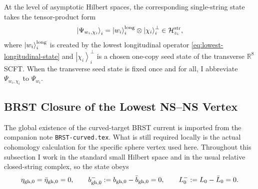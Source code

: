 \documentclass[11pt]{article}
\newcommand{\mc}[1]{\mathcal{#1}}
\newcommand{\bR}{\mathbb{R}}
\newcommand{\gh}{\mathrm{gh}}
\begin{document}
At the level of asymptotic Hilbert spaces, the corresponding single-string state takes the tensor-product form
\begin{equation}\label{eq:single-string-state-factorization}
\left|\Psi_{w_i,\chi_i}\right\rangle_i
=
\left|w_i\right\rangle_i^{\rm long}\otimes \left|\chi_i\right\rangle_i^\perp
\in
\mc H^{\rm str}_{z_i},
\end{equation}
where $\left|w_i\right\rangle_i^{\rm long}$ is created by the lowest longitudinal operator \eqref{eq:lowest-longitudinal-state} and $\left|\chi_i\right\rangle_i^\perp$ is a chosen one-copy seed state of the transverse $\bR^8$ SCFT. When the transverse seed state is fixed once and for all, I abbreviate $\Psi_{w_i,\chi_i}$ to $\Psi_{w_i}$.

\subsection{BRST Closure of the Lowest NS--NS Vertex}

The global existence of the curved-target BRST current is imported from the companion note \texttt{BRST-curved.tex}. What is still required locally is the actual cohomology calculation for the specific sphere vertex used here. Throughout this subsection I work in the standard small Hilbert space and in the usual relative closed-string complex, so the state obeys
\[
\eta_{\gh,0}=\bar\eta_{\gh,0}=0,
\qquad
b_{{\rm gh},0}^-:=b_{{\rm gh},0}-\bar b_{{\rm gh},0}=0,
\qquad
L_0^-:=L_0-\bar L_0=0.
\]
\end{document}
